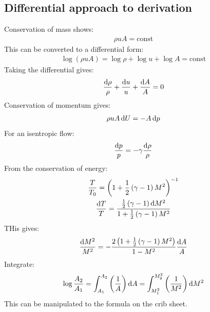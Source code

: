 \documentclass[class=report, crop=false, 12pt,a4paper]{standalone}
\begin{document}
\subsection{Differential approach to derivation}
Conservation of mass shows:
\begin{gather}
    \rho u A = \textrm{const}
\end{gather}
This can be converted to a differential form:
\begin{gather}
    \log\left(\rho u A\right) = \log \rho + \log u + \log A = \textrm{const}
\end{gather}
Taking the differential gives:
\begin{gather}
    \dfrac{\dif \rho}{\rho} + \dfrac{\dif u }{u} + \dfrac{\dif A}{A} = 0
\end{gather}
Conservation of momentum gives:
\begin{gather}
    \rho u A \dif U = - A \dif p
\end{gather}
For an isentropic flow:
\begin{gather}
    \dfrac{\dif p}{p} = - \gamma \dfrac{\dif \rho}{\rho}
\end{gather}
From the conservation of energy:
\begin{gather}
    \dfrac{T}{T_0} = \left(1 + \dfrac{1}{2}\left(\gamma - 1\right)M^2\right)^{-1}\\
    \dfrac{\dif T}{T} = \dfrac{\frac{1}{2}\left(\gamma -1\right)\dif M^2}{1 + \frac{1}{2}\left(\gamma -1 \right)M^2}
\end{gather}
THis gives:
\begin{gather}
    \dfrac{\dif M^2}{M^2} = -\dfrac{2\left(1 + \frac{1}{2}\left(\gamma - 1\right)M^2\right)}{1-M^2}\dfrac{\dif A}{A}
\end{gather}
Integrate:
\begin{gather}
    \log \frac{A_2}{A_1} = \int_{A_1}^{A_2} \left(\frac{1}{A}\right)\dif A = \int_{M^2_1}^{M^2_2}\left(\frac{1}{M^2}\right)\dif M^2
\end{gather}
This can be manipulated to the formula on the crib sheet.
\end{document}
